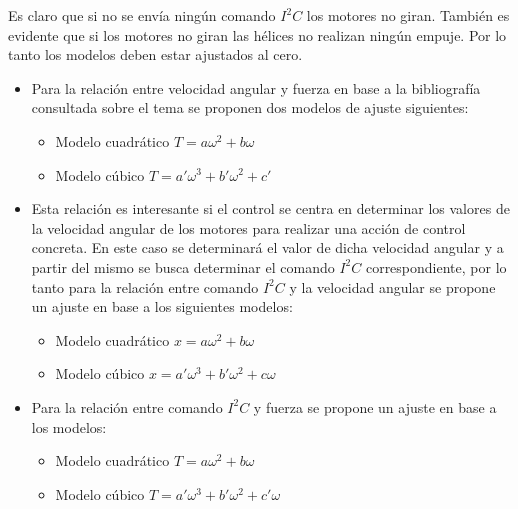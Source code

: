 \documentclass[main]{subfiles}
\begin{document}
Es claro que si no se env\'ia ning\'un comando $I^2C$ los motores no giran. Tambi\'en es evidente que si los motores no giran las h\'elices no realizan ning\'un empuje. Por lo tanto los modelos deben estar ajustados al cero. 
\begin{itemize}


\item Para la relaci\'on entre velocidad angular y fuerza en base a la bibliograf\'ia consultada sobre el tema se proponen dos modelos de ajuste siguientes:

	\begin{itemize}
	\item Modelo cuadr\'atico $T=a\omega^2+b\omega$
	\item Modelo c\'ubico $T=a\prime \omega^3+b\prime \omega^2+c\prime$
	\end{itemize}

\item Esta relaci\'on es interesante si el control se centra en determinar los valores de la velocidad angular de los motores para realizar una acci\'on de control concreta. En este caso se determinar\'a el valor de dicha velocidad angular y a partir del mismo se busca determinar el comando $I^2C$ correspondiente, por lo tanto para la relaci\'on entre comando $I^2C$ y la velocidad angular se propone un ajuste en base a los siguientes modelos:
	\begin{itemize}
	\item Modelo cuadr\'atico $x=a\omega^2+b\omega$
	\item Modelo c\'ubico $x =a\prime \omega^3+b\prime \omega^2+c\omega$	
	
	\end{itemize}

\item Para la relaci\'on entre comando $I^2C$  y fuerza se propone un ajuste en base a los modelos:
	\begin{itemize}
	\item Modelo cuadr\'atico $T=a \omega^2+b\omega$
	\item Modelo c\'ubico $T=a\prime \omega^3+b\prime\omega^2+c\prime\omega$
	\end{itemize}

\end{itemize}
\end{document}
